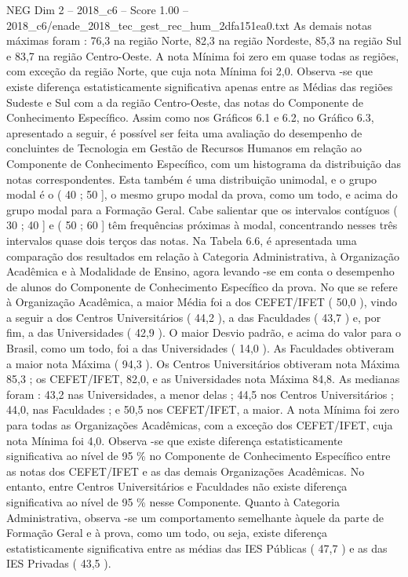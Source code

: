 \begin{textsample}{NEG Dim 2 – 2018\_c6 – Score 1.00 – 2018\_c6/enade\_2018\_tec\_gest\_rec\_hum\_2dfa151ea0.txt}
As demais notas máximas foram : 76,3 na região Norte, 82,3 na região Nordeste, 85,3 na região Sul e 83,7 na região Centro-Oeste.
A nota Mínima foi zero em quase todas as regiões, com exceção da região Norte, que cuja nota Mínima foi 2,0.
Observa -se que existe diferença estatisticamente significativa apenas entre as Médias das regiões Sudeste e Sul com a da região Centro-Oeste, das notas do Componente de Conhecimento Específico.
Assim como nos Gráficos 6.1 e 6.2, no Gráfico 6.3, apresentado a seguir, é possível ser feita uma avaliação do desempenho de concluintes de Tecnologia em Gestão de Recursos Humanos em relação ao Componente de Conhecimento Específico, com um histograma da distribuição das notas correspondentes.
Esta também é uma distribuição unimodal, e o grupo modal é o ( 40 ; 50 ], o mesmo grupo modal da prova, como um todo, e acima do grupo modal para a Formação Geral.
Cabe salientar que os intervalos contíguos ( 30 ; 40 ] e ( 50 ; 60 ] têm frequências próximas à modal, concentrando nesses três intervalos quase dois terços das notas.
Na Tabela 6.6, é apresentada uma comparação dos resultados em relação à Categoria Administrativa, à Organização Acadêmica e à Modalidade de Ensino, agora levando -se em conta o desempenho de alunos do Componente de Conhecimento Específico da prova.
No que se refere à Organização Acadêmica, a maior Média foi a dos CEFET/IFET ( 50,0 ), vindo a seguir a dos Centros Universitários ( 44,2 ), a das Faculdades ( 43,7 ) e, por fim, a das Universidades ( 42,9 ).
O maior Desvio padrão, e acima do valor para o Brasil, como um todo, foi a das Universidades ( 14,0 ).
As Faculdades obtiveram a maior nota Máxima ( 94,3 ).
Os Centros Universitários obtiveram nota Máxima 85,3 ; os CEFET/IFET, 82,0, e as Universidades nota Máxima 84,8.
As medianas foram : 43,2 nas Universidades, a menor delas ; 44,5 nos Centros Universitários ; 44,0, nas Faculdades ; e 50,5 nos CEFET/IFET, a maior.
A nota Mínima foi zero para todas as Organizações Acadêmicas, com a exceção dos CEFET/IFET, cuja nota Mínima foi 4,0.
Observa -se que existe diferença estatisticamente significativa ao nível de 95 \% no Componente de Conhecimento Específico entre as notas dos CEFET/IFET e as das demais Organizações Acadêmicas.
No entanto, entre Centros Universitários e Faculdades não existe diferença significativa ao nível de 95 \% nesse Componente.
Quanto à Categoria Administrativa, observa -se um comportamento semelhante àquele da parte de Formação Geral e à prova, como um todo, ou seja, existe diferença estatisticamente significativa entre as médias das IES Públicas ( 47,7 ) e as das IES Privadas ( 43,5 ).

\end{textsample}
